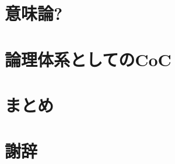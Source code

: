 \documentclass{ltjsarticle}
\begin{document}
\section{意味論?}

\section{論理体系としてのCoC}

\section{まとめ}

\section{謝辞}






\end{document}
